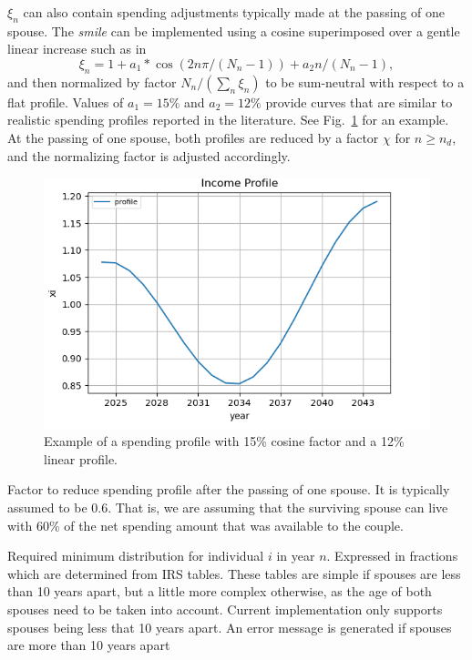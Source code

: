 \documentclass{report}[fleqn,12pt]
\begin{document}
\begin{description}[leftmargin=4em,style=multiline]
	$\xi_n$ can also contain spending adjustments typically made at the passing of one spouse.
	The {\em smile} can be implemented using a cosine superimposed over a gentle linear increase
	such as in
	\begin{equation}
		\xi_n = 1 + a_1*\cos(2n\pi/(N_n-1)) + a_2n/(N_n-1),
	\end{equation}
	and then normalized by factor $N_n/(\sum_n \xi_n )$ to be sum-neutral with respect to a flat profile.
	Values of $a_1 = 15\%$ and $a_2=12\%$ provide curves that are similar to realistic
	spending profiles reported in the literature. See Fig.~\ref{Fig:profile} for an example.
	At the passing of one spouse, both profiles are reduced by a factor $\chi$ for $n \ge n_d$,
	and the normalizing factor is adjusted accordingly.
	\begin{figure}[t]
	    \includegraphics{profile.png}
	    \caption{\small Example of a spending profile with 15\% cosine factor and a 12\% linear
	    profile. \label{Fig:profile}}
	\end{figure}
\item [$\chi$]
	Factor to reduce spending profile after the passing of one spouse. It is typically
	assumed to be 0.6. That is, we are assuming that the surviving spouse can live with
	60\% of the net spending amount that was available to the couple.
\item [$\rho_{in}$]
	Required minimum distribution for individual $i$ in year $n$. Expressed in fractions
	which are determined from IRS tables. These tables are simple if spouses are less than 10 years apart,
	but a little more complex otherwise, as the age of both spouses need to be taken into account.
	Current implementation only supports spouses being less that 10 years apart.
	An error message is generated if spouses are more than 10 years apart

\end{description}
\end{document}
